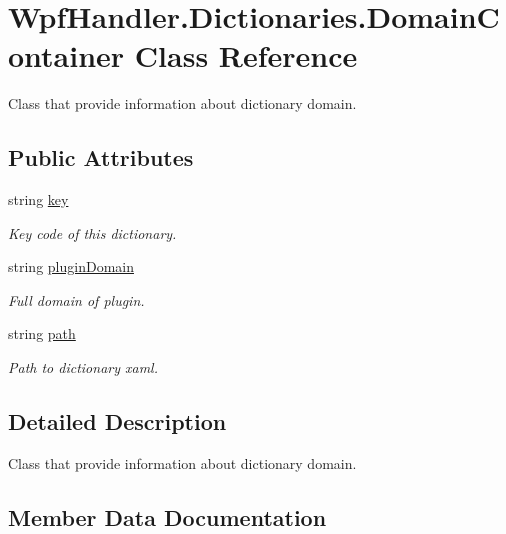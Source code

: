 \hypertarget{class_wpf_handler_1_1_dictionaries_1_1_domain_container}{}\section{Wpf\+Handler.\+Dictionaries.\+Domain\+Container Class Reference}
\label{class_wpf_handler_1_1_dictionaries_1_1_domain_container}


Class that provide information about dictionary domain.  


\subsection*{Public Attributes}
\begin{DoxyCompactItemize}
\item 
string \mbox{\hyperlink{class_wpf_handler_1_1_dictionaries_1_1_domain_container_ac87b2b5f12c34ef7c585f789a48667eb}{key}}
\begin{DoxyCompactList}\small\item\em Key code of this dictionary. \end{DoxyCompactList}\item 
string \mbox{\hyperlink{class_wpf_handler_1_1_dictionaries_1_1_domain_container_a364742e0754175046839e274bd1f1a1d}{plugin\+Domain}}
\begin{DoxyCompactList}\small\item\em Full domain of plugin. \end{DoxyCompactList}\item 
string \mbox{\hyperlink{class_wpf_handler_1_1_dictionaries_1_1_domain_container_a4b434bec866ecf4747ae30248fcbf760}{path}}
\begin{DoxyCompactList}\small\item\em Path to dictionary xaml. \end{DoxyCompactList}\end{DoxyCompactItemize}


\subsection{Detailed Description}
Class that provide information about dictionary domain. 



\subsection{Member Data Documentation}
\mbox{\label{class_wpf_handler_1_1_dictionaries_1_1_domain_container_ac87b2b5f12c34ef7c585f789a48667eb}} 
